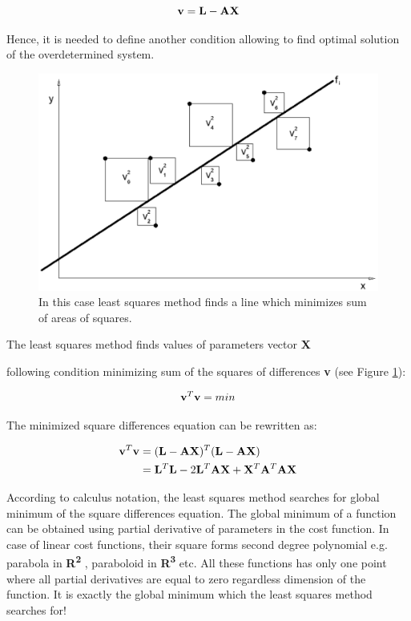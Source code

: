\documentclass[a4paper,12pt]{article}
\newcommand{\ematr}[1]{%
{\bf #1}%
}
\newcommand{\evect}[1]{%
{\bf #1}%
}
\newcommand{\eucl}[1]{%
{\bf R\textsuperscript{#1}}%
}
\begin{document}
\begin{equation}
\label{eq:least_v}
\evect{v} = \evect{L} - \ematr{A}\evect{X}
\end{equation} 

Hence, it is needed to define another condition allowing to find optimal solution of the 
overdetermined system.

\begin{figure}[h]
    \centering
    \includegraphics[scale=0.27]{figures/squares.png}
    \caption{In this case least squares method finds a line
    which minimizes sum of areas of squares. }
    \label{fig:squares}
\end{figure}

The least squares method finds values of parameters vector \evect{X} 
following condition minimizing sum of the squares of differences \evect{v} (see Figure \ref{fig:squares}): 

\begin{equation}
\evect{v}^{T} \evect{v} = min
\end{equation} 

The minimized square differences equation can be rewritten as:

\begin{equation}
\begin{split}
\evect{v}^{T} \evect{v} &= (\evect{L} - \ematr{A}\ematr{X})^{T} (\evect{L} - \ematr{A}\ematr{X}) \\
&= \evect{L}^{T} \evect{L} - 2 \evect{L}^{T} \ematr{A} \evect{X} + \evect{X}^{T} \ematr{A}^{T} \ematr{A} \evect{X}
\label{eq:least_be_part}
\end{split}
\end{equation} 

According to calculus notation, the least squares method searches for global minimum of the square differences equation. 
The global minimum of a function can be obtained using partial derivative of parameters in the cost function.
In case of linear cost functions,  
their square forms  second degree polynomial e.g. parabola in \eucl{2}, paraboloid in \eucl{3} etc. All these functions has
only one point where all partial derivatives are equal to zero regardless dimension of the function. It is 
exactly the global minimum which the least squares method searches for!
\end{document}
